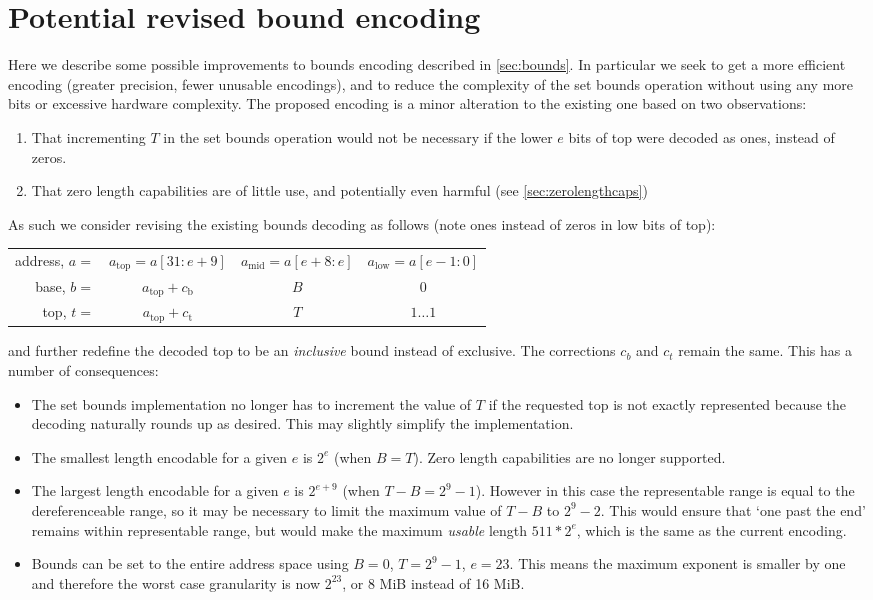 \chapter{Potential revised bound encoding}

Here we describe some possible improvements to bounds encoding described in \cref{sec:bounds}.
In particular we seek to get a more efficient encoding (greater precision, fewer unusable encodings), and to reduce the complexity of the set bounds operation without using any more bits or excessive hardware complexity.
The proposed encoding is a minor alteration to the existing one based on two observations:
\begin{enumerate}
\item That incrementing $T$ in the set bounds operation would not be necessary if the lower $e$ bits of top were decoded as ones, instead of zeros.
\item That zero length capabilities are of little use, and potentially even harmful (see \cref{sec:zerolengthcaps})
\end{enumerate}
As such we consider revising the existing bounds decoding as follows (note ones instead of zeros in low bits of top):
\begin{center}
{
\renewcommand{\arraystretch}{1.5}
\begin{tabular}{r|c|c|c|}
\cline{2-4}
address, $a =$ & $a_\text{top} = a[31:e+9]$ & $a_\text{mid} = a[e+8:e]$  & $a_\text{low} = a[e-1:0]$ \\ \cline{2-4}
base, $b =$    & $a_\text{top}+c_\text{b}$   & $B $ & $0$ \\ \cline{2-4}
top, $t =$     & $a_\text{top}+c_\text{t}$   & $T $ & $1\dots{}1$ \\ \cline{2-4}
\end{tabular}
}
\end{center}
and further redefine the decoded top to be an \emph{inclusive} bound instead of exclusive.
The corrections $c_b$ and $c_t$ remain the same.
This has a number of consequences:
\begin{itemize}
    \item The set bounds implementation no longer has to increment the value of $T$ if the requested top is not exactly represented because the decoding naturally rounds up as desired. 
    This may slightly simplify the implementation.
    \item The smallest length encodable for a given $e$ is $2^e$ (when $B=T$). Zero length capabilities are no longer supported.
    \item The largest length encodable for a given $e$ is $2^{e+9}$ (when $T-B=2^9-1$).
    However in this case the representable range is equal to the dereferenceable range, so it may be necessary to limit the maximum value of $T-B$ to $2^9 - 2$.
    This would ensure that `one past the end' remains within representable range, but would make the maximum \emph{usable} length $511 * 2^e$, which is the same as the current encoding.
    \item Bounds can be set to the entire address space using $B=0$, $T=2^9-1$, $e=23$. 
    This means the maximum exponent is smaller by one and therefore the worst case granularity is now $2^{23}$, or 8 MiB instead of 16 MiB.
\end{itemize}
